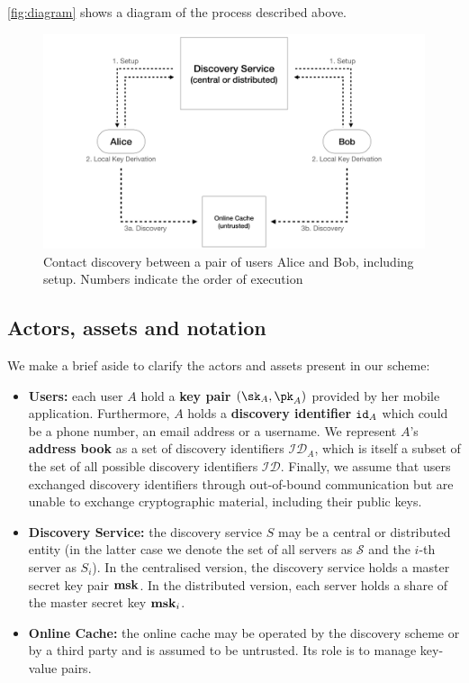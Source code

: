 \noindent \autoref{fig:diagram} shows a diagram of the process described above.

\begin{figure}[H]
	\begin{center}	
	  \includegraphics[width=\textwidth]{figures/system}
	  \caption{Contact discovery between a pair of users Alice and Bob, including setup. Numbers indicate the order of execution}
	  \label{fig:diagram}
	 \end{center}
 \end{figure}

	\subsection{Actors, assets and notation}
	
		\noindent We make a brief aside to clarify the actors and assets present in our scheme:		
		\begin{itemize}
			\item \textbf{Users:} each user $A$ hold a \textbf{key pair} $(\sk_A, \pk_A)$ provided by her mobile application. Furthermore, $A$ holds a \textbf{discovery identifier} $\mathtt{id}_A$ which could be a phone number, an email address or a username. We represent $A$'s \textbf{address book} as a set of discovery identifiers $\mathcal{ID}_A$, which is itself a subset of the set of all possible discovery identifiers $\mathcal{ID}$. Finally, we assume that users exchanged discovery identifiers through out-of-bound communication but are unable to exchange cryptographic material, including their public keys.
			\item \textbf{Discovery Service:} the discovery service $S$ may be a central or distributed entity (in the latter case we denote the set of all servers as $\mathcal{S}$ and the $i$-th server as $S_i$). In the centralised version, the discovery service holds a master secret key pair $\mathbf{msk}$. In the distributed version, each server holds a share of the master secret key $\mathbf{msk}_i$.
			\item \textbf{Online Cache:} the online cache may be operated by the discovery scheme or by a third party and is assumed to be untrusted. Its role is to manage key-value pairs.
			
			\end{itemize}
			
